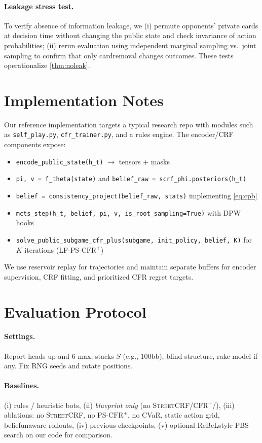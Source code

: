 \documentclass[10pt]{article}
\newcommand{\sCRF}{\textsc{Street\textendash CRF}\xspace} %
\newcommand{\CFRplus}{\ensuremath{\mathrm{CFR}^{+}}\xspace}
\newcommand{\CVaR}{\mathrm{CVaR}}
\newcommand{\1}{\mathbf{1}}
\theoremstyle{plain}
\begin{document}
\paragraph{Leakage stress test.}
To verify absence of information leakage, we (i) permute opponents' private cards at decision time without changing the public state and check invariance of action probabilities; (ii) rerun evaluation using independent marginal sampling vs.\ joint sampling to confirm that only card\textendash removal changes outcomes. These tests operationalize \cref{thm:noleak}.

\section{Implementation Notes}
Our reference implementation targets a typical research repo with modules such as \texttt{self\_play.py}, \texttt{cfr\_trainer.py}, and a rules engine. The encoder/CRF components expose:
\begin{itemize}[leftmargin=1.25em]
  \item \verb|encode_public_state(h_t)| $\rightarrow$ tensors + masks
  \item \verb|pi, v = f_theta(state)| and \verb|belief_raw = scrf_phi.posteriors(h_t)|
  \item \verb|belief = consistency_project(belief_raw, stats)| implementing \cref{eq:cpb}
  \item \verb|mcts_step(h_t, belief, pi, v, is_root_sampling=True)| with DPW hooks
  \item \verb|solve_public_subgame_cfr_plus(subgame, init_policy, belief, K)| for $K$ iterations (LF-PS-\CFRplus)
\end{itemize}
We use reservoir replay for trajectories and maintain separate buffers for encoder supervision, CRF fitting, and prioritized CFR regret targets.

\section{Evaluation Protocol}
\paragraph{Settings.} Report heads-up and 6-max; stacks $S$ (e.g., $100$bb), blind structure, rake model if any. Fix RNG seeds and rotate positions.

\paragraph{Baselines.} (i) rules / heuristic bots, (ii) \emph{blueprint only} (no \sCRF/\CFRplus/\CVaR), (iii) ablations: no \sCRF, no PS-\CFRplus, no CVaR, static action grid, belief\textendash unaware rollouts, (iv) previous checkpoints, (v) optional ReBeL\textendash style PBS search on our code for comparison.
\end{document}
